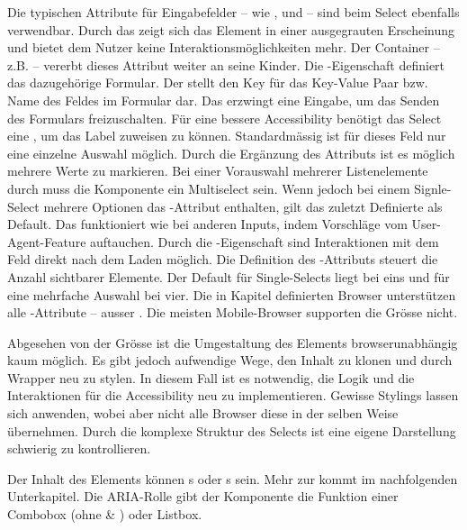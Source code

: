 Die typischen Attribute für Eingabefelder – wie ,  und  
– sind beim Select ebenfalls verwendbar. %
Durch das  zeigt sich das Element in einer ausgegrauten Erscheinung und bietet dem Nutzer keine Interaktionsmöglichkeiten mehr. 
Der Container – z.B.  – vererbt dieses Attribut weiter an seine Kinder. 
Die -Eigenschaft definiert das dazugehörige Formular. 
Der  stellt den Key für das Key-Value Paar bzw. Name des Feldes im Formular dar. 
Das  erzwingt eine Eingabe, um das Senden des Formulars freizuschalten. 
Für eine bessere Accessibility benötigt das Select eine , um das Label zuweisen zu können. 
Standardmässig ist für dieses Feld nur eine einzelne Auswahl möglich. 
Durch die Ergänzung des Attributs  ist es möglich mehrere Werte zu markieren. 
Bei einer Vorauswahl mehrerer Listenelemente durch  muss die Komponente ein Multiselect sein. 
Wenn jedoch bei einem Signle-Select mehrere Optionen das -Attribut enthalten, gilt das zuletzt Definierte als Default. 
Das  funktioniert wie bei anderen Inputs, indem Vorschläge vom User-Agent-Feature auftauchen. 
Durch die -Eigenschaft sind Interaktionen mit dem Feld direkt nach dem Laden möglich. 
Die Definition des -Attributs steuert die Anzahl sichtbarer Elemente. 
Der Default für Single-Selects liegt bei eins und für eine mehrfache Auswahl bei vier. 
Die in Kapitel \textbf{} definierten Browser unterstützen alle -Attribute – ausser .
Die meisten Mobile-Browser supporten die Grösse nicht. 

Abgesehen von der Grösse ist die Umgestaltung des Elements browserunabhängig kaum möglich. 
Es gibt jedoch aufwendige Wege, den Inhalt zu klonen und durch Wrapper neu zu stylen. 
In diesem Fall ist es notwendig, die Logik und die Interaktionen für die Accessibility neu zu implementieren. 
Gewisse Stylings lassen sich anwenden, wobei aber nicht alle Browser diese in der selben Weise übernehmen. 
Durch die komplexe Struktur des Selects ist eine eigene Darstellung schwierig zu kontrollieren. 

Der Inhalt des Elements können s oder s sein. 
Mehr zur  kommt im nachfolgenden Unterkapitel. 
Die ARIA-Rolle gibt der Komponente die Funktion einer Combobox (ohne  \& ) oder Listbox. 


